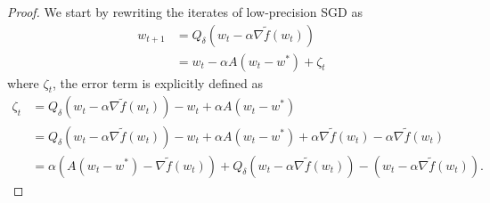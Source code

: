 \begin{proof}
We start by rewriting the iterates of low-precision SGD as
\begin{align*}
    w_{t+1} &= Q_\delta(w_t - \alpha \nabla \tilde{f}(w_t)) \\
    &= w_t - \alpha A(w_t-w^*) + \zeta_t
\end{align*}
where $\zeta_t$, the error term is explicitly defined as
\begin{align*}
    \zeta_t &= Q_\delta(w_t - \alpha \nabla \tilde{f}(w_t)) - w_t + \alpha A(w_t - w^*) \\
    &= Q_\delta(w_t - \alpha \nabla \tilde{f}(w_t)) - w_t + \alpha A(w_t - w^*) + \alpha \nabla \tilde{f}(w_t) - \alpha \nabla \tilde{f}(w_t) \\
    &= \alpha(A(w_t - w^*) - \nabla\tilde{f}(w_t)) + Q_\delta(w_t - \alpha \nabla \tilde{f}(w_t)) - (w_t - \alpha \nabla \tilde{f}(w_t)).
\end{align*}


\end{proof}
